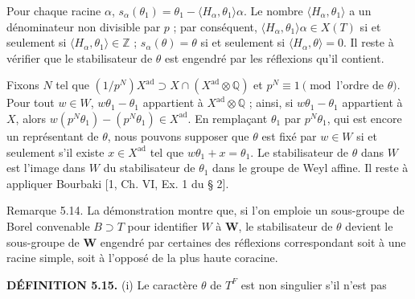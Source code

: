 \documentclass[9pt,twoside]{extarticle}
\begin{document}
{Pour chaque racine \(\alpha\), \(s_\alpha(\theta_1)=\theta_1-\langle H_\alpha,\theta_1\rangle\alpha\). Le nombre \(\langle H_\alpha,\theta_1\rangle\) a un dénominateur non divisible par \(p\) ; par conséquent, \(\langle H_\alpha,\theta_1\rangle\alpha\in X(T)\) si et seulement si \(\langle H_\alpha,\theta_1\rangle\in\mathbb Z\) ; \(s_\alpha(\theta)=\theta\) si et seulement si \(\langle H_\alpha,\theta\rangle=0\). Il reste à vérifier que le stabilisateur de \(\theta\) est engendré par les réflexions qu'il contient.\par

Fixons \(N\) tel que \((1/p^N)X^{\mathrm{ad}}\supset X\cap(X^{\mathrm{ad}}\otimes\mathbb Q)\) et \(p^N\equiv1\pmod{\text{l'ordre de }\theta}\). Pour tout \(w\in W\), \(w\theta_1-\theta_1\) appartient à \(X^{\mathrm{ad}}\otimes\mathbb Q\) ; ainsi, si \(w\theta_1-\theta_1\) appartient à \(X\), alors \(w(p^N\theta_1)-(p^N\theta_1)\in X^{\mathrm{ad}}\). En remplaçant \(\theta_1\) par \(p^N\theta_1\), qui est encore un représentant de \(\theta\), nous pouvons supposer que \(\theta\) est fixé par \(w\in W\) si et seulement s'il existe \(x\in X^{\mathrm{ad}}\) tel que \(w\theta_1+x=\theta_1\). Le stabilisateur de \(\theta\) dans \(W\) est l'image dans \(W\) du stabilisateur de \(\theta_1\) dans le groupe de Weyl affine. Il reste à appliquer Bourbaki [1, Ch. VI, Ex. 1 du § 2].\par

Remarque 5.14. La démonstration montre que, si l'on emploie un sous-groupe de Borel convenable \(B\supset T\) pour identifier \(W\) à \(\mathbf W\), le stabilisateur de \(\theta\) devient le sous-groupe de \(\mathbf W\) engendré par certaines des réflexions correspondant soit à une racine simple, soit à l'opposé de la plus haute coracine.\par

\noindent\textbf{DÉFINITION 5.15.} (i) Le caractère \(\theta\) de \(T^F\) est non singulier s'il n'est pas\par
}
\end{document}
